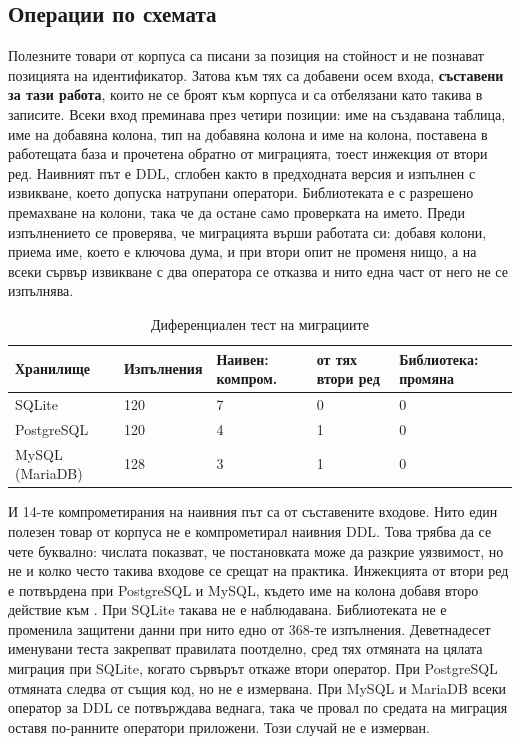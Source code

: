 \subsection{Операции по схемата}
\label{sec:eval-ddl}

Полезните товари от корпуса са писани за позиция на стойност и не познават
позицията на идентификатор. Затова към тях са добавени осем входа, \textbf{съставени
за тази работа}, които не се броят към корпуса и са отбелязани като такива в
записите. Всеки вход преминава през четири позиции: име на създавана таблица, име
на добавяна колона, тип на добавяна колона и име на колона, поставена в работещата
база и прочетена обратно от миграцията, тоест инжекция от втори ред. Наивният път е
DDL, сглобен както в предходната версия и изпълнен с извикване, което допуска
натрупани оператори. Библиотеката е  с разрешено премахване на
колони, така че да остане само проверката на името. Преди изпълнението се проверява, че
миграцията върши работата си: добавя колони, приема име, което е ключова дума, и
при втори опит не променя нищо, а на всеки сървър извикване с два оператора се
отказва и нито една част от него не се изпълнява.

\begin{table}[H]
\centering
\caption{Диференциален тест на миграциите}
\label{tab:eval-ddl}
\begin{tabularx}{\textwidth}{L{3.0cm}YYYY}
\toprule
\textbf{Хранилище} & \textbf{Изпълнения} & \textbf{Наивен: компром.} & \textbf{от тях втори ред} & \textbf{Библиотека: промяна} \\
\midrule
SQLite & 120 & 7 & 0 & 0 \\
PostgreSQL & 120 & 4 & 1 & 0 \\
MySQL (MariaDB) & 128 & 3 & 1 & 0 \\
\bottomrule
\end{tabularx}
\end{table}

И 14-те компрометирания на наивния път са от съставените входове. Нито един
полезен товар от корпуса не е компрометирал наивния DDL. Това трябва да се чете
буквално: числата показват, че постановката може да разкрие уязвимост, но не и
колко често такива входове се срещат на практика. Инжекцията от втори ред е
потвърдена при PostgreSQL и MySQL, където име на колона добавя второ действие към
. При SQLite такава не е наблюдавана. Библиотеката не е променила защитени данни
при нито едно от 368-те изпълнения. Деветнадесет именувани теста закрепват
правилата поотделно, сред тях отмяната на цялата миграция при SQLite, когато сървърът
откаже втори оператор. При PostgreSQL отмяната следва от същия код, но не е измервана. При MySQL и MariaDB всеки оператор за DDL се потвърждава
веднага, така че провал по средата на миграция оставя по-ранните оператори
приложени. Този случай не е измерван.

